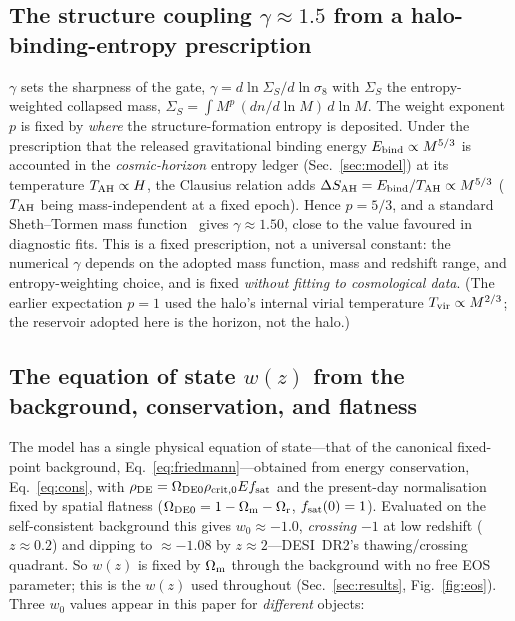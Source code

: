 \subsection{The structure coupling $\gamma\approx1.5$ from a halo-binding-entropy prescription}
$\gamma$ sets the sharpness of the gate, $\gamma=d\ln\Sigma_S/d\ln\sigma_8$ with $\Sigma_S$ the
entropy-weighted collapsed mass, $\Sigma_S=\int M^p\,(dn/d\ln M)\,d\ln M$. The weight exponent $p$ is
fixed by \emph{where} the structure-formation entropy is deposited. Under the prescription that the
released gravitational binding energy $E_{\rm bind}\propto M^{5/3}$ is accounted in the
\emph{cosmic-horizon} entropy ledger (Sec.~\ref{sec:model}) at its temperature $T_{\mathrm{AH}}\propto H$, the
Clausius relation adds $\Delta S_{\rm AH}=E_{\rm bind}/T_{\mathrm{AH}}\propto M^{5/3}$ ($T_{\mathrm{AH}}$ being
mass-independent at a fixed epoch). Hence $p=5/3$, and a standard Sheth--Tormen mass
function~\cite{Sheth:1999mn} gives $\gamma\approx1.50$, close to the value favoured in diagnostic
fits. This is a fixed prescription, not a universal constant: the numerical $\gamma$ depends on the
adopted mass function, mass and redshift range, and entropy-weighting choice, and is fixed
\emph{without fitting to cosmological data}. (The earlier expectation $p=1$ used the halo's internal
virial temperature $T_{\rm vir}\propto M^{2/3}$; the reservoir adopted here is the horizon, not the
halo.)

\subsection{The equation of state $w(z)$ from the background, conservation, and flatness}
The model has a single physical equation of state---that of the canonical fixed-point background,
Eq.~\eqref{eq:friedmann}---obtained from energy conservation, Eq.~\eqref{eq:cons}, with
$\rho_{\mathrm{DE}}=\Omega_{\mathrm{DE0}}\rho_{\rm crit,0}Ef_{\mathrm{sat}}$ and the present-day normalisation fixed by spatial flatness
($\Omega_{\mathrm{DE0}}=1-\Omega_{\mathrm m}-\Omega_{\mathrm r}$, $f_{\mathrm{sat}}(0)=1$). Evaluated on the self-consistent background this gives
$w_0\approx-1.0$, \emph{crossing} $-1$ at low redshift ($z\approx0.2$) and dipping to $\approx-1.08$ by
$z\approx2$---DESI~DR2's thawing/crossing quadrant. So $w(z)$ is fixed by $\Omega_{\mathrm m}$ through the background
with no free EOS parameter; this is the $w(z)$ used throughout (Sec.~\ref{sec:results},
Fig.~\ref{fig:eos}). Three $w_0$ values appear in this paper for \emph{different} objects:


